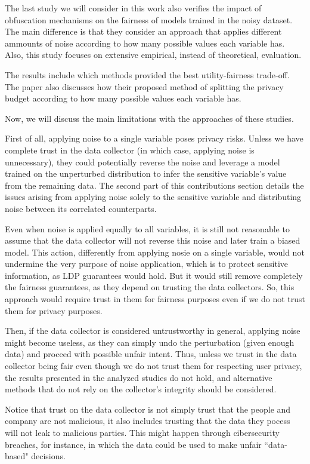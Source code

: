 \documentclass[conference]{IEEEtran}
\newcommand{\qm}[1]{``#1"}
\begin{document}
The last study we will consider in this work \cite{arcolezi2023local} also verifies the impact of obfuscation mechanisms on the fairness of models trained in the noisy dataset. The main difference is that they consider an approach that applies different ammounts of noise according to how many possible values each variable has. Also, this study focuses on extensive empirical, instead of theoretical, evaluation.

The results include which methods provided the best utility-fairness trade-off. The paper also discusses how their proposed method of splitting the privacy budget according to how many possible values each variable has.

Now, we will discuss the main limitations with the approaches of these studies.

First of all, applying noise to a single variable poses privacy risks. Unless we have complete trust in the data collector (in which case, applying noise is unnecessary), they could potentially reverse the noise and leverage a model trained on the unperturbed distribution to infer the sensitive variable's value from the remaining data. The second part of this contributions section details the issues arising from applying noise solely to the sensitive variable and distributing noise between its correlated counterparts.

Even when noise is applied equally to all variables, it is still not reasonable to assume that the data collector will not reverse this noise and later train a biased model. This action, differently from applying nosie on a single variable, would not undermine the very purpose of noise application, which is to protect sensitive information, as LDP guarantees would hold. But it would still remove completely the fairness guarantees, as they depend on trusting the data collectors. So, this approach would require trust in them for fairness purposes even if we do not trust them for privacy purposes.

Then, if the data collector is considered untrustworthy in general, applying noise might become useless, as they can simply undo the perturbation (given enough data) and proceed with possible unfair intent. Thus, unless we trust in the data collector being fair even though we do not trust them for respecting user privacy, the results presented in the analyzed studies do not hold, and alternative methods that do not rely on the collector's integrity should be considered.

Notice that trust on the data collector is not simply trust that the people and company are not malicious, it also includes trusting that the data they pocess will not leak to malicious parties. This might happen through cibersecurity breaches, for instance, in which the data could be used to make unfair \qm{data-based} decisions.
\end{document}
